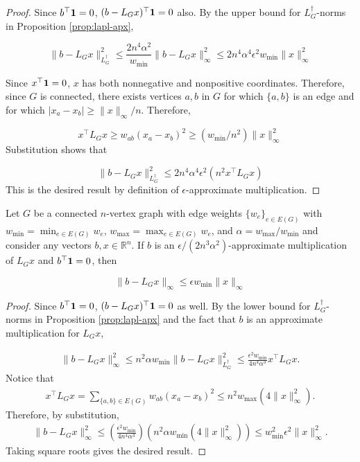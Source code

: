 \begin{proof}
Since $b^\top {\bf 1} = 0$, $(b - L_Gx)^\top {\bf 1} = 0$ also. By the upper bound for $L_G^{\dagger}$-norms in Proposition \ref{prop:lapl-apx},

$$\|b - L_Gx\|_{L_G^{\dagger}}^2\le \frac{2n^4\alpha^2}{w_{\min}} \|b - L_Gx\|_{\infty}^2\le 2n^4\alpha^4\epsilon^2w_{\min} \|x\|_{\infty}^2$$

Since $x^\top {\bf 1} = 0$, $x$ has both nonnegative and nonpositive coordinates. Therefore, since $G$ is connected, there exists vertices $a,b$ in $G$ for which $\{a,b\}$ is an edge and for which $|x_a - x_b| \ge \|x\|_{\infty}/n$. Therefore,

$$x^\top L_G x \ge w_{ab}(x_a - x_b)^2\ge (w_{\min}/n^2) \|x\|_{\infty}^2$$
Substitution shows that

$$\|b - L_G x\|_{L_G^{\dagger}}^2\le 2n^4\alpha^4\epsilon^2(n^2 x^\top L_G x)$$
This is the desired result by definition of $\epsilon$-approximate multiplication.
\end{proof}

\begin{corollary}
Let $G$ be a connected $n$-vertex graph with edge weights $\{w_e\}_{e\in E(G)}$ with $w_{\min} = \min_{e\in E(G)} w_e$, $w_{\max} = \max_{e\in E(G)} w_e$, and $\alpha = w_{\max}/w_{\min}$ and consider any vectors $b,x\in \mathbb{R}^n$. If $b$ is an $\epsilon/(2n^3\alpha^2)$-approximate multiplication of $L_Gx$ and $b^\top {\bf1} = 0$, then

$$\|b - L_Gx\|_{\infty} \le \epsilon w_{\min}\|x\|_{\infty}$$
\end{corollary}

\begin{proof}
Since $b^\top {\bf 1} = 0$, $(b - L_Gx)^\top {\bf 1} = 0$ as well. By the lower bound for $L_G^{\dagger}$-norms in Proposition \ref{prop:lapl-apx} and the fact that $b$ is an approximate multiplication for $L_Gx$,

\begin{align*}
\|b - L_G x\|_{\infty}^2\le n^2 \alpha w_{\min} \|b - L_G x\|_{L_G^{\dagger}}^2\le \frac{\epsilon^2 w_{\min}}{4n^4\alpha^3} x^\top L_G x .
\end{align*}
Notice that
\begin{align*}
x^\top L_Gx = \sum_{\{a,b\}\in E(G)} w_{ab}(x_a - x_b)^2\le n^2 w_{\max} (4\|x\|_{\infty}^2) .
\end{align*}
Therefore, by substitution,
\begin{align*}
\|b - L_G x\|_{\infty}^2\le (\frac{\epsilon^2w_{\min}}{4n^4\alpha^3})(n^2 \alpha w_{\min} (4\|x\|_{\infty}^2))\le w_{\min}^2 \epsilon^2 \|x\|_{\infty}^2 .
\end{align*}
Taking square roots gives the desired result.
\end{proof}

